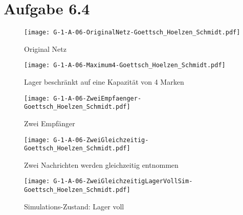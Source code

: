 \documentclass[12pt, paper=a4]{article}
\begin{document}
\section*{Aufgabe 6.4}
\begin{figure}[h!]
\centering
\texttt{[image: G-1-A-06-OriginalNetz-Goettsch\_Hoelzen\_Schmidt.pdf]}
\caption{Original Netz}
\end{figure}

\begin{figure}[h!]
\centering
\texttt{[image: G-1-A-06-Maximum4-Goettsch\_Hoelzen\_Schmidt.pdf]}
\caption{Lager beschränkt auf eine Kapazität von 4 Marken}
\end{figure}

\begin{figure}[h!]
\centering
\texttt{[image: G-1-A-06-ZweiEmpfaenger-Goettsch\_Hoelzen\_Schmidt.pdf]}\caption{Zwei Empfänger}
\end{figure}

\begin{figure}[h!]
\centering
\texttt{[image: G-1-A-06-ZweiGleichzeitig-Goettsch\_Hoelzen\_Schmidt.pdf]}
\caption{Zwei Nachrichten werden gleichzeitig entnommen}
\end{figure}

\begin{figure}[h!]
\centering
\texttt{[image: G-1-A-06-ZweiGleichzeitigLagerVollSim-Goettsch\_Hoelzen\_Schmidt.pdf]}
\caption{Simulations-Zustand: Lager voll}
\end{figure}
\end{document}
